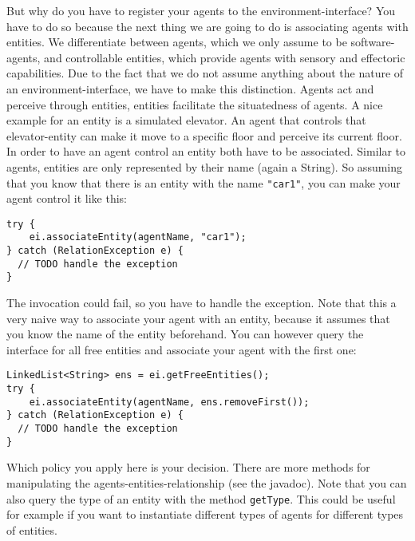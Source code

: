 \documentclass[a4]{article}
\begin{document}
But why do you have to register your agents to the environment-interface? 
You have to do so because the next thing we are going to do is associating agents with entities.
We differentiate between agents, which we only assume to be software-agents, and controllable entities,
which provide agents with sensory and effectoric capabilities. 
Due to the fact that we do not assume anything about the nature of an environment-interface, we have to
make this distinction. 
Agents act and perceive through entities, entities facilitate the situatedness of agents.
A nice example for an entity is a simulated elevator. 
An agent that controls that elevator-entity can make it move
to a specific floor and perceive its current floor. In order to have an agent control an entity both have to be associated.
Similar to agents, entities are only represented by their name (again a String). 
So assuming that you know that there is an entity with the name \texttt{"car1"}, you can make your agent control it like this:
\begin{verbatim}
try {
    ei.associateEntity(agentName, "car1");
} catch (RelationException e) {
  // TODO handle the exception
}
\end{verbatim}
The invocation could fail, so you have to handle the exception. Note that this a very naive way to associate your agent
with an entity, because it assumes that you know the name of the entity beforehand. 
You can however query the interface for all free entities and associate your agent with the first one:
\begin{verbatim}
LinkedList<String> ens = ei.getFreeEntities();
try {
    ei.associateEntity(agentName, ens.removeFirst());
} catch (RelationException e) {
  // TODO handle the exception
}
\end{verbatim}
Which policy you apply here is your decision. There are more methods for manipulating the agents-entities-relationship
(see the javadoc). Note that you can also query the type of an entity with the method \texttt{getType}. This could be useful
for example if you want to instantiate different types of agents for different types of entities.
\end{document}
